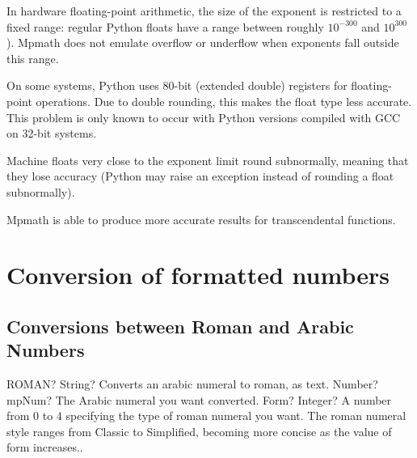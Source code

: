 In hardware floating-point arithmetic, the size of the exponent is restricted to a fixed range: regular Python floats have a range between roughly $10^{-300}$ and $10^{300}$). Mpmath does not emulate overflow or underflow when exponents fall outside this range.

On some systems, Python uses 80-bit (extended double) registers for floating-point operations. Due to double rounding, this makes the float type less accurate. This problem is only known to occur with Python versions compiled with GCC on 32-bit systems.

Machine floats very close to the exponent limit round subnormally, meaning that they lose accuracy (Python may raise an exception instead of rounding a float subnormally).

Mpmath is able to produce more accurate results for transcendental functions.





%
%


\newpage
\section{Conversion of formatted numbers}
\subsection{Conversions between Roman and Arabic Numbers}

\begin{mpFunctionsExtract}
	\mpWorksheetFunctionTwoNotImplemented
	{ROMAN? String? Converts an arabic numeral to roman, as text.}
	{Number? mpNum? The Arabic numeral you want converted.}
	{Form? Integer? A number from 0 to 4 specifying the type of roman numeral you want. The roman numeral style ranges from Classic to Simplified, becoming more concise as the value of form increases..}
\end{mpFunctionsExtract}

